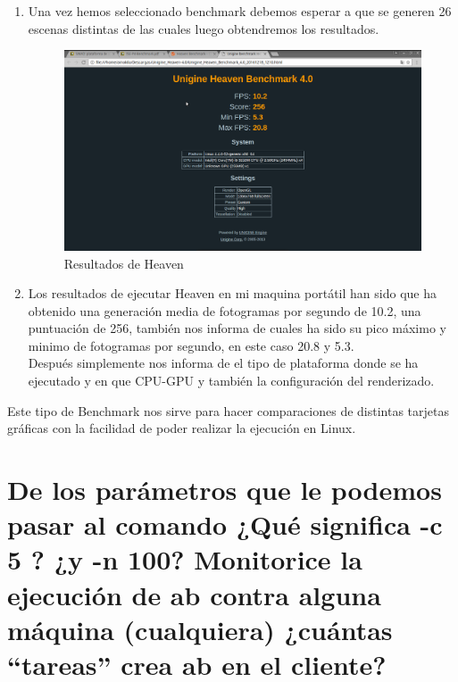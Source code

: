 \begin{enumerate}
	\item Una vez hemos seleccionado benchmark debemos esperar a que se generen 26 escenas distintas de las cuales luego obtendremos los resultados.
	
	\begin{figure}[H] %
		\centering
		\includegraphics[scale=0.3]{pics/heaven7}  %
		\caption{Resultados de Heaven} \label{fig:HEAVEN6}
	\end{figure}

	\item Los resultados de ejecutar Heaven en mi maquina portátil han sido que ha obtenido una generación media de fotogramas por segundo de 10.2, una puntuación de 256, también nos informa de cuales ha sido su pico máximo y minimo de fotogramas por segundo, en este caso 20.8 y 5.3.\\
	Después simplemente nos informa de el tipo de plataforma donde se ha ejecutado y en que CPU-GPU y también la configuración del renderizado.
	
\end{enumerate}

Este tipo de Benchmark nos sirve para hacer comparaciones de distintas tarjetas gráficas con la facilidad de poder realizar la ejecución en Linux.



\section[Cuestión 2]{De los parámetros que le podemos pasar al comando ¿Qué significa -c 5 ? ¿y -n 100? Monitorice la ejecución de ab contra alguna	máquina (cualquiera) ¿cuántas “tareas” crea ab en el cliente?}

